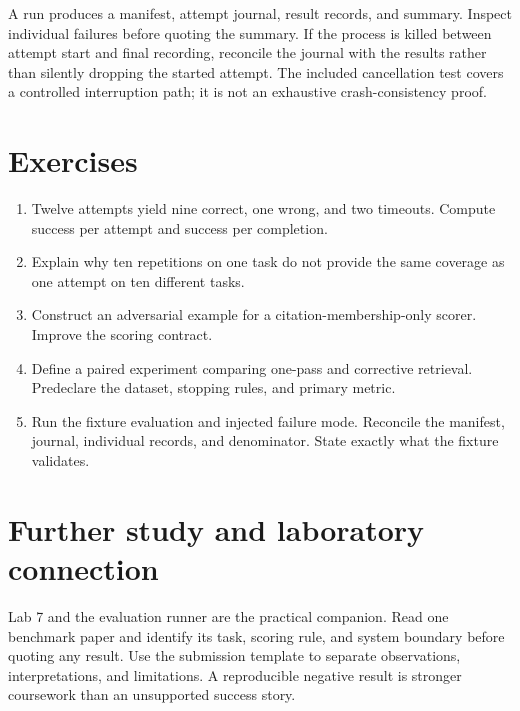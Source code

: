 A run produces a manifest, attempt journal, result records, and summary. Inspect individual failures before quoting the summary. If the process is killed between attempt start and final recording, reconcile the journal with the results rather than silently dropping the started attempt. The included cancellation test covers a controlled interruption path; it is not an exhaustive crash-consistency proof.

\section{Exercises}
\begin{enumerate}
\item Twelve attempts yield nine correct, one wrong, and two timeouts. Compute success per attempt and success per completion.
\item Explain why ten repetitions on one task do not provide the same coverage as one attempt on ten different tasks.
\item Construct an adversarial example for a citation-membership-only scorer. Improve the scoring contract.
\item Define a paired experiment comparing one-pass and corrective retrieval. Predeclare the dataset, stopping rules, and primary metric.
\item Run the fixture evaluation and injected failure mode. Reconcile the manifest, journal, individual records, and denominator. State exactly what the fixture validates.
\end{enumerate}

\section{Further study and laboratory connection}
Lab 7 and the evaluation runner are the practical companion. Read one benchmark paper and identify its task, scoring rule, and system boundary before quoting any result. Use the submission template to separate observations, interpretations, and limitations. A reproducible negative result is stronger coursework than an unsupported success story.

